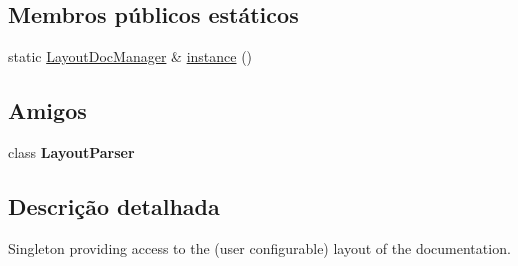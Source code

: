 \subsection*{Membros públicos estáticos}
\begin{DoxyCompactItemize}
\item 
static \hyperlink{class_layout_doc_manager}{Layout\-Doc\-Manager} \& \hyperlink{class_layout_doc_manager_a71438c8d0950671039760608959fa0e2}{instance} ()
\end{DoxyCompactItemize}
\subsection*{Amigos}
\begin{DoxyCompactItemize}
\item 
\hypertarget{class_layout_doc_manager_aaa876b66a7f0c8c8766635655c0dff49}{class {\bfseries Layout\-Parser}}\label{class_layout_doc_manager_aaa876b66a7f0c8c8766635655c0dff49}

\end{DoxyCompactItemize}


\subsection{Descrição detalhada}
Singleton providing access to the (user configurable) layout of the documentation. 

